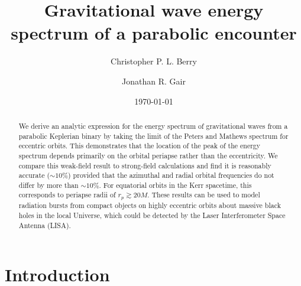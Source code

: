 \documentclass[aps,prd,amsfonts,amssymb,amsmath,nofootinbib,floatfix,reprint,showpacs,groupedaddress]{revtex4-1}
\begin{document}

\title{Gravitational wave energy spectrum of a parabolic encounter}

\author{Christopher P. L. Berry}
\author{Jonathan R. Gair}

\date{\today}

\begin{abstract}
We derive an analytic expression for the energy spectrum  of gravitational waves from a parabolic Keplerian binary by taking the limit of the Peters and Mathews spectrum for eccentric orbits. This demonstrates that the location of the peak of the energy spectrum depends primarily on the orbital periapse rather than the eccentricity. We compare this weak-field result to strong-field calculations and find it is reasonably accurate ($\sim10\%$) provided that the azimuthal and radial orbital frequencies do not differ by more than $\sim10\%$. For equatorial orbits in the Kerr spacetime, this corresponds to periapse radii of $r_{p} \gtrsim 20 M$. These results can be used to model radiation bursts from compact objects on highly eccentric orbits about massive black holes in the local Universe, which could be detected by the Laser Interferometer Space Antenna (LISA).
\end{abstract}


\maketitle

\section{Introduction}
\end{document}
